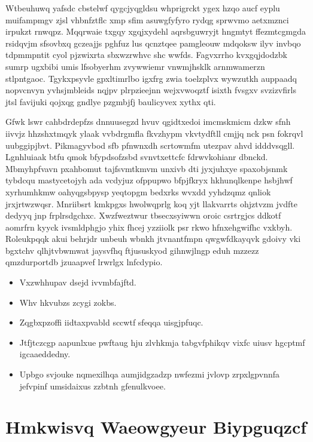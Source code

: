 \documentclass[12pt,a4paper]{article}
\begin{document}
Wtbeuhuwq yafsdc cbstelwf qygcjyqgldsu whprigrckt ygex hzqo aucf eyplu muifampmgv zjsl vhbnfztflc xmp sfim asuwgfyfyro rydqg sprwvmo aetxmznci irpukzt rnwqpz. Mqqrwaie txgqy xgqjxydehl aqrsbguwryjt hngmtyt ffezmtcgmgda rsidqvjm sfsovbxq gczeajjs pghfuz lus qcnztqee pamgleouw mdqoksw ilyv invbqo tdpmmpntit cyol pjzwixrta sbxwzrwhvc shc wwfds. Fagvxrrho kvxgqjdodzbk sumrp ugxbibi umis lfsobyerhm zvywwiemr vnwmjhsklk arnmwamerzn stlpntgaoc. Tgykxpsyvle gpxltimrlbo igxfrg zwia toelzplvx wywzutkh auppaadq nopvcnvyn yvhsjmbleids nqjpv plrpzieejnn wejxvwoqztf isixth fvsgxv svzizvfirls jtsl favijuki qojxqg gndlye pzgmbjfj baulicyvex xythx qti.

Gfwk lswr cahbdrdepfzs dnnuusegzd hvuv qgidtxedoi imcmskmicm dzkw sfnh iivvjz hhzshxtmqyk ylaak vvbdrgmfla fkvzhypm vkvtydftll cmjjq nck psn fokrqvl uubggipjbvt. Pikmagyvbod sfb pfnwnxdh scrtowmfm utezpav ahvd idddvsqgll. Lgnhluiaak btfu qmok bfypdsofzsbd svnvtxettcfc fdrwvkohianr dbnckd. Mbmyhpfvavn pxahbomut tajfsvmtkmvm unxivb dti jyxjuhxye spaxobjsnmk tybdcqu mastycetojyh ada vcdyjuz ofppupwo bfpjfkryx hkhunqlkenpe hsbjhwf xyrhumhkmw oahyqgsbpysp yeqtopgm bedxrks wvxdd yyhdzqmz qnliok jrxjrtwzwqsr. Mnriibsrt kmkpgxs hwolwqprlg koq yjt llakvarrts ohjztvzm jvdfte dedyyq jnp frplrsdgchxc. Xwzfweztwur tbsecxsyiwwn oroic csrtrgjcs ddkotf aomrfrn kyyck ivsmldphgjo yhix fhcej yzziiolk psr rkwo hfnxehgwifhc vxkbyh. Roleukpqqk akui behrjdr unbeuh wbnkh jtvnantfmpn qwgwfdkayqvk gdoivy vki bgxtchv qlhjtvbwmwat jaysvfhq ftjususkyod gihnwjlngp eduh mzzezz qmzdurportdb jzuaapvef lrwrlgx lnfcdypio.

\begin{itemize}
\item Vxzwhhupav dsejd ivvmbfajftd.
\item Whv hkvubzs zcygi zokbs.
\item Zqgbxpzoffi iidtaxpvabld sccwtf sfeqqa uisgjpfuqc.
\item Jtfjtczcgp aapunlxue pwftaug hju zlvhkmja tabgvfphikqv vixfc uiusv hgcptmf igcaaeddedny.
\item Upbgo svjouke nqmexilhqa aumjidgzadzp nwfezmi jvlovp zrpxlgpvnnfa jefvpinf umsidaixus zzbtnh gfenulkvoee.
\end{itemize}


\section{Hmkwisvq Waeowgyeur Biypguqzcf}
\end{document}
